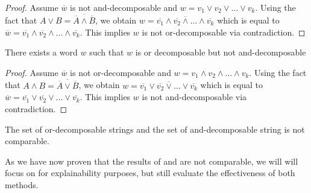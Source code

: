 \begin{proof}
	Assume $\overbar{w}$ is not and-decomposable and $w = v_1 \lor v_2 \lor \dots \lor v_k$.
	Using the fact that $A \lor B = \overbar{\overbar{A} \land \overbar{B}}$, we obtain $w = \overbar{\overbar{v_1} \land \overbar{v_2} \land \dots \land \overbar{v_k}}$ which is equal to $\overbar{w} = \overbar{v_1} \land \overbar{v_2} \land \dots \land \overbar{v_k}$.
	This implies $w$ is not or-decomposable via contradiction.
\end{proof}


\begin{theorem}
	There exists a word $w$ such that $w$ is or decomposable but not and-decomposable
\end{theorem}

\begin{proof}
	Assume $\overbar{w}$ is not or-decomposable and $w = v_1 \land v_2 \land \dots \land v_k$.
	Using the fact  that $A \land B = \overbar{\overbar{A} \lor \overbar{B}}$, we obtain $w = \overbar{\overbar{v_1} \lor \overbar{v_2} \lor \dots \lor \overbar{v_k}}$ which is equal to $\overbar{w} = \overbar{v_1} \lor \overbar{v_2} \lor \dots \lor \overbar{v_k}$.
	This implies $w$ is not and-decomposable via contradiction.
\end{proof}

\begin{corollary}
	The set of or-decomposable strings and the set of and-decomposable string is not comparable.
\end{corollary}

As we have now proven that the results of \andDecomp and \orDecomp are not comparable, we will will focus on \orDecomp for explainability purposes, but still evaluate the effectiveness of both methods.



